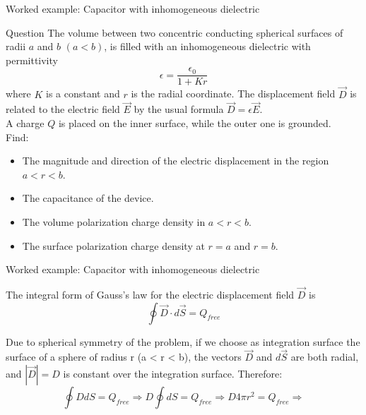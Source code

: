 {
\problemslide

%
%
%

\begin{frame}{Worked example: Capacitor with inhomogeneous dielectric}

  \begin{blockexmplque}{Question}
    The volume between two concentric conducting spherical surfaces of
    radii $a$ and $b$ $(a < b)$, is filled with an inhomogeneous dielectric
    with permittivity
    \begin{equation*}
       \epsilon = \frac{\epsilon_0}{1+Kr}
    \end{equation*}
    where $K$ is a constant and $r$ is the radial coordinate.
    The displacement field $\vec{D}$ is related to the electric
    field $\vec{E}$ by the usual formula $\vec{D} = \epsilon \vec{E}$.\\
    A charge $Q$ is placed on the inner surface,
    while the outer one is grounded.\\
    Find:
    \begin{itemize}
      \item The magnitude and direction of the electric displacement
       in the region $a < r < b$.
      \item The capacitance of the device.
      \item The volume polarization charge density in $a < r < b$.
      \item The surface polarization charge density at $r = a$ and $r = b$.
    \end{itemize}
  \end{blockexmplque}

\end{frame}

%
%
%

\begin{frame}{Worked example: Capacitor with inhomogeneous dielectric}

  The integral form of Gauss's law for the electric displacement field
  $\vec{D}$ is
  \begin{equation*}
    \oint \vec{D} \cdot d\vec{S} = Q_{free}
  \end{equation*}

  Due to spherical symmetry of the problem, if we choose as integration
  surface the surface of a sphere of radius r (a < r < b),
  the vectors $\vec{D}$ and $d\vec{S}$ are both radial,
  and $|\vec{D}|=D$ is constant over the integration surface.
  Therefore:
  \begin{equation*}
    \oint D dS = Q_{free}  \Rightarrow
     D \oint dS = Q_{free} \Rightarrow
     D 4 \pi r^2 = Q_{free} \Rightarrow
  \end{equation*}


\end{frame}}
